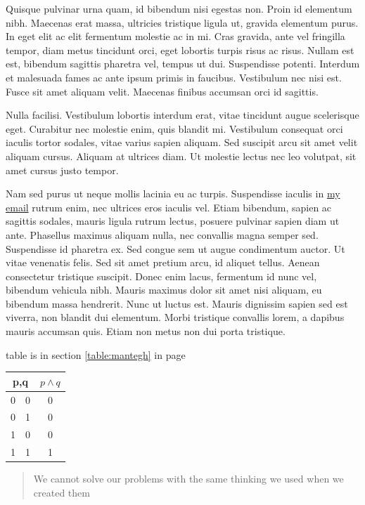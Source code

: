 \documentclass[a4paper,12pt]{article}
\begin{document}
	
	
	{\large Quisque} {\Huge pulvinar} {\tiny urna} quam, id bibendum nisi egestas non. Proin id elementum nibh. Maecenas erat massa, ultricies tristique ligula ut, gravida elementum purus. In eget elit ac elit fermentum molestie ac in mi. Cras gravida, ante vel fringilla tempor, diam metus tincidunt orci, eget lobortis turpis risus ac risus. Nullam est est, bibendum sagittis pharetra vel, tempus ut dui. Suspendisse potenti. Interdum et malesuada fames ac ante ipsum primis in faucibus. Vestibulum nec nisi est. Fusce sit amet aliquam velit. Maecenas finibus accumsan orci id sagittis.
	
	Nulla facilisi. Vestibulum lobortis interdum erat, vitae tincidunt augue scelerisque eget. Curabitur nec molestie enim, quis blandit mi. Vestibulum consequat orci iaculis tortor sodales, vitae varius sapien aliquam. Sed suscipit arcu sit amet velit aliquam cursus. Aliquam at ultrices diam. Ut molestie lectus nec leo volutpat, sit amet cursus justo tempor.
	
	Nam sed purus ut neque mollis lacinia eu ac turpis. Suspendisse iaculis in \href{mailto:example@gmail.com}{my email} rutrum enim, nec ultrices eros iaculis vel. Etiam bibendum, sapien ac sagittis sodales, mauris ligula rutrum lectus, posuere pulvinar sapien diam ut ante. Phasellus maximus aliquam nulla, nec convallis magna semper sed. Suspendisse id pharetra ex. Sed congue sem ut augue condimentum auctor. Ut vitae venenatis felis. Sed sit amet pretium arcu, id aliquet tellus. Aenean consectetur tristique suscipit. Donec enim lacus, fermentum id nunc vel, bibendum vehicula nibh. Mauris maximus dolor sit amet nisi aliquam, eu bibendum massa hendrerit. Nunc ut luctus est. Mauris dignissim sapien sed est viverra, non blandit dui elementum. Morbi tristique convallis lorem, a dapibus mauris accumsan quis. Etiam non metus non dui porta tristique.
	
	table is in section \ref{table:mantegh} in page \pageref{table:mantegh}
	
	\begin{tabular}{|cc||c|}
		\hline
		\multicolumn{2}{|c||}{p,q} & $p \wedge q$ \\
		\hline 
		0 & 0 & 0\\
		0 & 1 & 0\\
		1 & 0 & 0\\
		1 & 1 & 1\\
		\hline
	\end{tabular}
	
	
	\begin{quote}
		We cannot solve our problems with the same thinking we used when we created them
	\end{quote}
\end{document}
